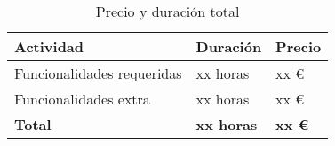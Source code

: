 \begin{table}[!ht]
\begin{center}
\begin{tabular}{|p{80mm}|p{25mm}|p{20mm}|} \hline 
\textbf{Actividad} & \textbf{Duración} & \textbf{Precio} \\ \hline

Funcionalidades requeridas &
xx horas &
xx \euro{}
\\
\hline

Funcionalidades extra &
xx horas &
xx \euro{}
\\
\hline \hline

{\bfseries Total} &
{\bfseries xx horas} &
{\bfseries xx \euro{}}
\\
\hline

\end{tabular}
\end{center}
\caption{Precio y duración total}
\label{table:resOthers3}
\end{table}

